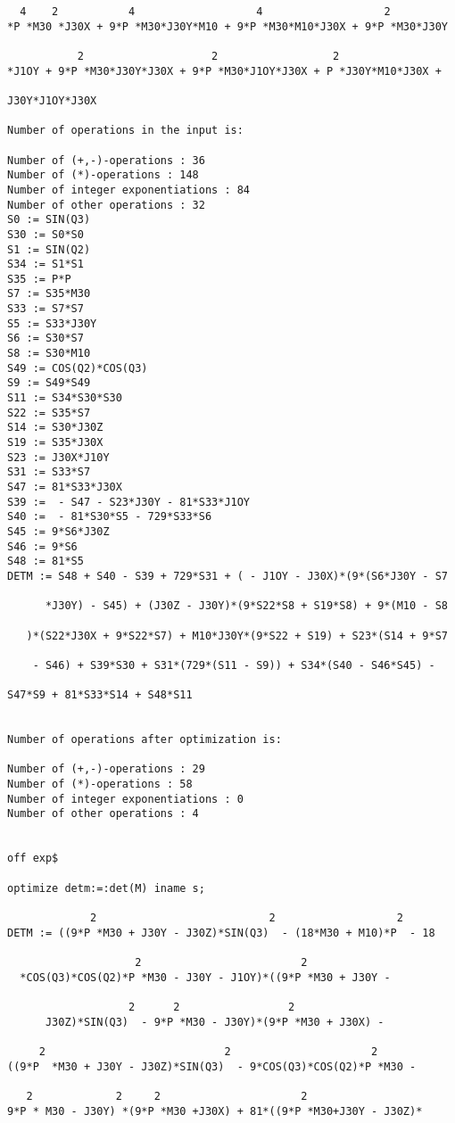 {\begin{verbatim}
  4    2           4                   4                   2
*P *M30 *J30X + 9*P *M30*J30Y*M10 + 9*P *M30*M10*J30X + 9*P *M30*J30Y

           2                    2                  2
*J1OY + 9*P *M30*J30Y*J30X + 9*P *M30*J1OY*J30X + P *J30Y*M10*J30X + 

J30Y*J1OY*J30X

Number of operations in the input is:

Number of (+,-)-operations : 36
Number of (*)-operations : 148
Number of integer exponentiations : 84
Number of other operations : 32
S0 := SIN(Q3)
S30 := S0*S0
S1 := SIN(Q2)
S34 := S1*S1
S35 := P*P
S7 := S35*M30
S33 := S7*S7
S5 := S33*J30Y
S6 := S30*S7
S8 := S30*M10
S49 := COS(Q2)*COS(Q3)
S9 := S49*S49
S11 := S34*S30*S30
S22 := S35*S7
S14 := S30*J30Z
S19 := S35*J30X
S23 := J30X*J10Y
S31 := S33*S7
S47 := 81*S33*J30X
S39 :=  - S47 - S23*J30Y - 81*S33*J1OY
S40 :=  - 81*S30*S5 - 729*S33*S6
S45 := 9*S6*J30Z
S46 := 9*S6
S48 := 81*S5
DETM := S48 + S40 - S39 + 729*S31 + ( - J1OY - J30X)*(9*(S6*J30Y - S7

      *J30Y) - S45) + (J30Z - J30Y)*(9*S22*S8 + S19*S8) + 9*(M10 - S8

   )*(S22*J30X + 9*S22*S7) + M10*J30Y*(9*S22 + S19) + S23*(S14 + 9*S7

    - S46) + S39*S30 + S31*(729*(S11 - S9)) + S34*(S40 - S46*S45) - 

S47*S9 + 81*S33*S14 + S48*S11


Number of operations after optimization is:

Number of (+,-)-operations : 29
Number of (*)-operations : 58
Number of integer exponentiations : 0
Number of other operations : 4


off exp$

optimize detm:=:det(M) iname s;

             2                           2                   2
DETM := ((9*P *M30 + J30Y - J30Z)*SIN(Q3)  - (18*M30 + M10)*P  - 18

                    2                         2
  *COS(Q3)*COS(Q2)*P *M30 - J30Y - J1OY)*((9*P *M30 + J30Y - 

                   2      2                 2
      J30Z)*SIN(Q3)  - 9*P *M30 - J30Y)*(9*P *M30 + J30X) - 

     2                            2                      2
((9*P  *M30 + J30Y - J30Z)*SIN(Q3)  - 9*COS(Q3)*COS(Q2)*P *M30 - 

   2             2     2                      2
9*P * M30 - J30Y) *(9*P *M30 +J30X) + 81*((9*P *M30+J30Y - J30Z)*


\end{verbatim}}

